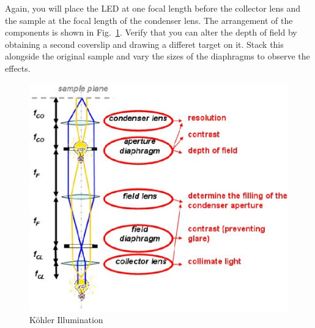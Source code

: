 \documentclass[a4paper]{report}
\begin{document}
Again, you will place the LED at one focal length before the collector
lens and the sample at the focal length of the condenser lens. The
arrangement of the components is shown in Fig.~\ref{koehler}. Verify
that you can alter the depth of field by obtaining a second coverslip
and drawing a differet target on it. Stack this alongside the original
sample and vary the sizes of the diaphragms to observe the effects. 


\begin{figure}[h]
\center
\includegraphics[width=5in]{koehler.eps}
\caption{K\"{o}hler Illumination}
\label{koehler}
\end{figure}
\end{document}
